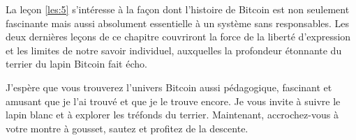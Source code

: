 La leçon \ref{les:5} s'intéresse à la façon dont l'histoire de Bitcoin est non
seulement fascinante mais aussi absolument essentielle à un système sans
responsables. Les deux dernières leçons de ce chapitre couvriront la force de la
liberté d'expression et les limites de notre savoir individuel, auxquelles la
profondeur étonnante du terrier du lapin Bitcoin fait écho.

J'espère que vous trouverez l'univers Bitcoin aussi pédagogique, fascinant et
amusant que je l'ai trouvé et que je le trouve encore. Je vous invite à suivre
le lapin blanc et à explorer les tréfonds du terrier. Maintenant, accrochez-vous
à votre montre à gousset, sautez et profitez de la descente.
